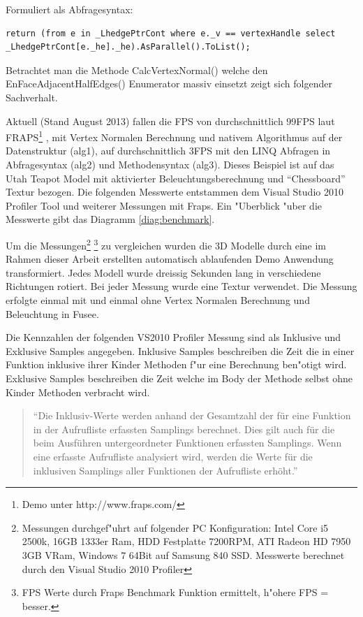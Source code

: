 \documentclass[pagesize, paper=a4, fontsize=12pt,titlepage=true, headings=small, headnosepline, abstractoff, liststotoc, nochapterprefix, plainheadsepline]{scrreprt}
\begin{document}
Formuliert als Abfragesyntax:
\begin{lstlisting}[label={code:alg2}]
return (from e in _LhedgePtrCont where e._v == vertexHandle select _LhedgePtrCont[e._he]._he).AsParallel().ToList();
\end{lstlisting}

Betrachtet man die Methode CalcVertexNormal() welche den EnFaceAdjacentHalfEdges() Enumerator massiv einsetzt zeigt sich folgender Sachverhalt.

Aktuell (Stand August 2013) fallen die FPS von durchschnittlich 99FPS laut FRAPS\footnote{ Demo unter http://www.fraps.com/} , mit Vertex Normalen Berechnung und nativem Algorithmus auf der Datenstruktur (alg1\label{code:alg1}), auf durchschnittlich 3FPS mit den LINQ Abfragen in Abfragesyntax (alg2\label{code:alg2}) und Methodensyntax (alg3\label{code:alg3}). Dieses Beispiel ist auf das Utah Teapot Model mit aktivierter Beleuchtungsberechnung und "`Chessboard"' Textur bezogen. Die folgenden Messwerte entstammen dem Visual Studio 2010 Profiler Tool und weiterer Messungen mit Fraps. Ein "Uberblick "uber die Messwerte gibt das Diagramm \ref{diag:benchmark}.
\newline

Um die Messungen\footnote{Messungen durchgef"uhrt auf folgender PC Konfiguration: Intel Core i5 2500k, 16GB 1333er Ram, HDD Festplatte 7200RPM, ATI Radeon HD 7950 3GB VRam, Windows 7 64Bit auf Samsung 840 SSD. Messwerte berechnet durch den Visual Studio 2010 Profiler\label{fn-messungenPC}} \footnote{FPS Werte durch Fraps Benchmark Funktion ermittelt, h"ohere FPS = besser.} zu vergleichen wurden die 3D Modelle durch eine im Rahmen dieser Arbeit erstellten automatisch ablaufenden Demo Anwendung transformiert. Jedes Modell wurde dreissig Sekunden lang in verschiedene Richtungen rotiert. Bei jeder Messung wurde eine Textur verwendet. Die Messung erfolgte einmal mit und einmal ohne Vertex Normalen Berechnung und Beleuchtung in Fusee.
\newline

Die Kennzahlen der folgenden VS2010 Profiler Messung sind als Inklusive und Exklusive Samples angegeben. Inklusive Samples beschreiben die Zeit die in einer Funktion inklusive ihrer Kinder Methoden f"ur eine Berechnung ben"otigt wird. Exklusive Samples beschreiben die Zeit welche im Body der Methode selbst ohne Kinder Methoden verbracht wird.

\begin{quote}"`Die Inklusiv-Werte werden anhand der Gesamtzahl der f{\"u}r eine Funktion in der Aufrufliste erfassten Samplings berechnet. Dies gilt auch f{\"u}r die beim Ausf{\"u}hren untergeordneter Funktionen erfassten Samplings. Wenn eine erfasste Aufrufliste analysiert wird, werden die Werte f{\"u}r die inklusiven Samplings aller Funktionen der Aufrufliste erh{\"o}ht."' \cite[Analyse von Leistungsdaten]{MicrosoftCReferenz.2013}\end{quote}
\end{document}
